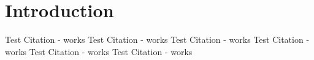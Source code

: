 \documentclass[12pt]{article}
\begin{document}
\newpage
\tableofcontents

\newpage

\section{Introduction}

Test Citation - works \cite[1]{steindlKIVerordnungRevisited2023} 
Test Citation - works \cite[73]{maslejAIIndex20232023}
Test Citation - works \cite[1]{gorzalaEuropaischesHaftungssystemFur2023} 
Test Citation - works \cite{ansariHowMetaBroke2023} 
Test Citation - works \cite[1]{ansariHowMetaBroke2023} 
Test Citation - works \cite[5]{codagnoneIdentificationAssessmentExisting2022}

\printbibliography
\end{document}
